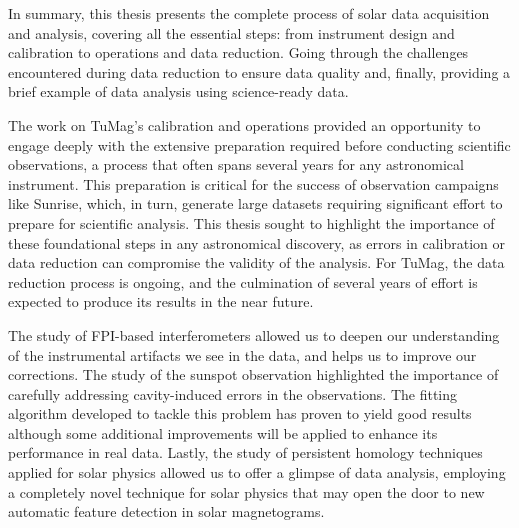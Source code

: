 In summary, this thesis presents the complete process of solar data acquisition and analysis, covering all the essential steps: from instrument design and calibration to operations and data reduction. Going through the challenges encountered during data reduction to ensure data quality and, finally, providing a brief example of data analysis using science-ready data.

The work on TuMag's calibration and operations provided an opportunity to engage deeply with the extensive preparation required before conducting scientific observations, a process that often spans several years for any astronomical instrument. This preparation is critical for the success of observation campaigns like Sunrise, which, in turn, generate large datasets requiring significant effort to prepare for scientific analysis. This thesis sought to highlight the importance of these foundational steps in any astronomical discovery, as errors in calibration or data reduction can compromise the validity of the analysis. 
For TuMag, the data reduction process is ongoing, and the culmination of several years of effort is expected to produce its results in the near future.   

The study of FPI-based interferometers allowed us to deepen our understanding of the instrumental artifacts we see in the data, and helps us to improve our corrections. The study of the sunspot observation highlighted the importance of carefully addressing cavity-induced errors in the observations. The fitting algorithm developed to tackle this problem has proven to yield good results although some additional improvements will be applied to enhance its performance in real data. Lastly, the study of persistent homology techniques applied for solar physics allowed us to offer a glimpse of data analysis, employing a completely novel technique for solar physics that may open the door to new automatic feature detection in solar magnetograms.